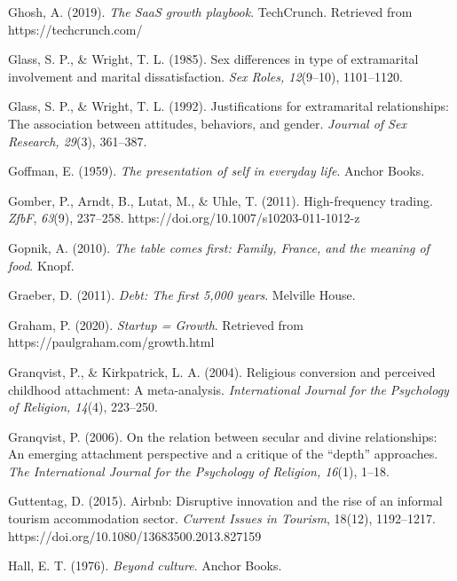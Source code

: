 \begin{thebibliography}{}
    Ghosh, A. (2019). \textit{The SaaS growth playbook}. TechCrunch. Retrieved from https://techcrunch.com/
    
    Glass, S. P., \& Wright, T. L. (1985). Sex differences in type of extramarital involvement and marital dissatisfaction. \textit{Sex Roles, 12}(9–10), 1101–1120.
    
    Glass, S. P., \& Wright, T. L. (1992). Justifications for extramarital relationships: The association between attitudes, behaviors, and gender. \textit{Journal of Sex Research, 29}(3), 361–387.
    
    Goffman, E. (1959). \textit{The presentation of self in everyday life}. Anchor Books.

    Gomber, P., Arndt, B., Lutat, M., \& Uhle, T. (2011). High-frequency trading. \textit{ZfbF}, \textit{63}(9), 237–258. https://doi.org/10.1007/s10203-011-1012-z

    Gopnik, A. (2010). \textit{The table comes first: Family, France, and the meaning of food}. Knopf.

    Graeber, D. (2011). \textit{Debt: The first 5{,}000 years}. Melville House.

    Graham, P. (2020). \textit{Startup = Growth}. Retrieved from https://paulgraham.com/growth.html

    Granqvist, P., \& Kirkpatrick, L. A. (2004). Religious conversion and perceived childhood attachment: A meta-analysis. \textit{International Journal for the Psychology of Religion, 14}(4), 223–250.

    Granqvist, P. (2006). On the relation between secular and divine relationships: An emerging attachment perspective and a critique of the “depth” approaches. \textit{The International Journal for the Psychology of Religion, 16}(1), 1–18.

    Guttentag, D. (2015). Airbnb: Disruptive innovation and the rise of an informal tourism accommodation sector. \textit{Current Issues in Tourism}, 18(12), 1192–1217. https://doi.org/10.1080/13683500.2013.827159


    Hall, E. T. (1976). \textit{Beyond culture}. Anchor Books.


\end{thebibliography}
